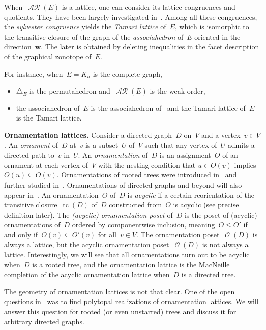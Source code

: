 \documentclass{amsart}
\theoremstyle{definition}
\renewcommand{\b}[1]{\boldsymbol{#1}} %
\renewcommand{\c}[1]{\mathcal{#1}} %
\newcommand{\simplex}{\triangle} %
\DeclareMathOperator{\tc}{tc} %
\newcommand{\para}[1]{\bigskip\noindent\textbf{#1}} %
\newcommand{\darkblue}{\color{darkblue}} %
\newcommand{\defn}[1]{\textsl{\darkblue #1}} %
\DeclareMathOperator{\Orn}{\c{O}}  %
\DeclareMathOperator{\AReori}{\c{AR}}  %
\begin{document}
When~$\AReori(E)$ is a lattice, one can consider its lattice congruences and quotients.
They have been largely investigated in~\cite{Pilaud-acyclicReorientationLattices}.
Among all these congruences, the \defn{sylvester congruence} yields the \defn{Tamari lattice} of~$E$, which is isomorphic to the transitive closure of the graph of the \defn{associahedron} of~$E$ oriented in the direction~$\b{w}$.
The later is obtained by deleting inequalities in the facet description of the graphical zonotope of~$E$.

For instance, when~$E = K_n$ is the complete graph,
\begin{itemize}
\item $\simplex_E$ is the permutahedron and~$\AReori(E)$ is the weak order,
\item the associahedron of~$E$ is the associahedron of~\cite{ShniderSternberg,Loday} and the Tamari lattice of~$E$ is the Tamari lattice.
\end{itemize}


\para{Ornamentation lattices.}
Consider a directed graph~$D$ on~$V$ and a vertex~$v \in V$.
An \defn{ornament} of~$D$ at~$v$ is a subset~$U$ of~$V$ such that any vertex of~$U$ admits a directed path to~$v$ in~$U$.
An \defn{ornamentation} of~$D$ is an assignment~$O$ of an ornament at each vertex of~$V$ with the nesting condition that $u \in O(v)$ implies~$O(u) \subseteq O(v)$.
Ornamentations of rooted trees were introduced in~\cite{DefantSack} and further studied in~\cite{ajran2025pop}.
Ornamentations of directed graphs and beyond will also appear in~\cite{Sack}.
An ornamentation~$O$ of~$D$ is \defn{acyclic} if a certain reorientation of the transitive closure~$\tc(D)$ of~$D$ constructed from~$O$ is acyclic (see precise definition later).
The \defn{(acyclic) ornamentation poset} of~$D$ is the poset of (acyclic) ornamentations of~$D$ ordered by componentwise inclusion, meaning~$O \le O'$ if and only if~${O(v) \subseteq O'(v)}$ for all~$v \in V$.
The ornamentation poset~$\Orn(D)$ is always a lattice, but the acyclic ornamentation poset~$\Orn(D)$ is not always a lattice.
Interestingly, we will see that all ornamentations turn out to be acyclic when~$D$ is a rooted tree, and the ornamentation lattice is the MacNeille completion of the acyclic ornamentation lattice when~$D$ is a directed tree.

The geometry of ornamentation lattices is not that clear.
One of the open questions in~\cite{DefantSack} was to find polytopal realizations of ornamentation lattices.
We will answer this question for rooted (or even unstarred) trees and discuss it for arbitrary directed graphs.
\end{document}
